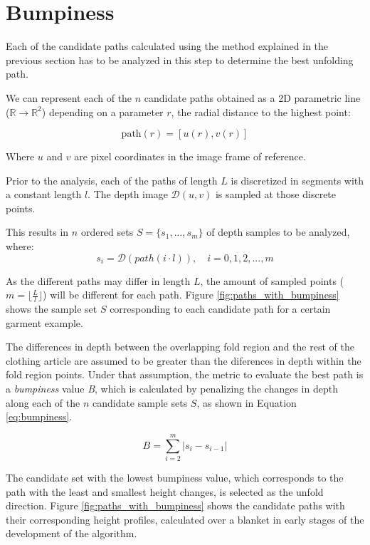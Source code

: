 \section{Bumpiness}
\label{pnp:bumpiness}
Each of the candidate paths calculated using the method explained in the previous section has to be analyzed in this step to determine the best unfolding path. 

We can represent each of the $n$ candidate paths obtained as a 2D parametric line ($\mathbb{R} \to \mathbb{R}^2$) depending on a parameter $r$, the radial distance to the highest point:

\begin{equation}
\textrm{path}(r) = \left[u(r), v(r)\right]
\end{equation}

Where $u$ and $v$ are pixel coordinates in the image frame of reference.

Prior to the analysis, each of the paths of length $L$ is discretized in segments with a constant length $l$. The depth image $\mathcal{D}(u,v)$ is sampled at those discrete points. 

\pagebreak
This results in $n$ ordered sets $S=\{ s_1,...,s_m\}$ of depth samples to be analyzed, where:
\begin{equation}
s_i = \mathcal{D}(path(i \cdot l)), \quad  i=0,1,2,..., m
\end{equation}

As the different paths may differ in length $L$, the amount of sampled points ($m=${\Large$\lfloor\frac{L}{l}\rfloor$}) will be different for each path. Figure \ref{fig:paths_with_bumpiness} shows the sample set $S$ corresponding to each candidate path for a certain garment example.

The differences in depth between the overlapping fold region and the rest of the clothing article are assumed to be greater than the diferences in depth within the fold region points. Under that assumption, the metric to evaluate the best path is a \textit{bumpiness} value \textit{B}, which is calculated by penalizing the changes in depth along each of the $n$ candidate sample sets $S$, as shown in Equation \ref{eq:bumpiness}.

\begin{equation}\label{eq:bumpiness}
B = \sum_{i=2}^{m} | s_i- s_{i-1} | 
\end{equation}

The candidate set with the lowest bumpiness value, which corresponds to the path with the least and smallest height changes, is selected as the unfold direction. Figure \ref{fig:paths_with_bumpiness} shows the candidate paths with their corresponding height profiles, calculated over a blanket in early stages of the development of the algorithm.

